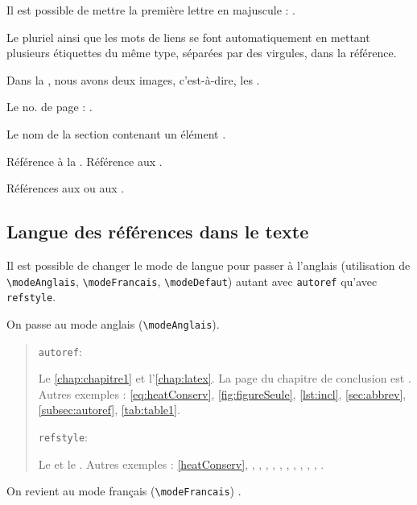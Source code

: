 Il est possible de mettre la première lettre en majuscule : .

Le pluriel ainsi que les mots de liens se font automatiquement en mettant plusieurs étiquettes du même type,  séparées par des virgules, dans la référence.

Dans la , nous avons deux images, c'est-à-dire, les .

Le no. de page : . 

Le nom de la section contenant un élément .

Référence à la . Référence aux .

Références aux  ou aux  .

\subsection{Langue des références dans le texte}
\label{subsec:three}

Il est possible de changer le mode de langue pour passer à l'anglais (utilisation de \verb|\modeAnglais|, \verb|\modeFrancais|, \verb|\modeDefaut|) autant avec \texttt{autoref} qu'avec \texttt{refstyle}.

On passe au mode anglais (\verb|\modeAnglais|).
\modeAnglais

\begin{quote}
	\texttt{autoref}:
	
	Le \autoref{chap:chapitre1} et l'\autoref{chap:latex}. La page du chapitre de conclusion est . Autres exemples : \autoref{eq:heatConserv}, \autoref{fig:figureSeule}, \autoref{lst:incl}, \autoref{sec:abbrev}, \autoref{subsec:autoref}, \autoref{tab:table1}.
	
	\texttt{refstyle}:
	
	Le  et le . Autres exemples : \eqref{heatConserv}, , , , , , , , , , , .
\end{quote}

On revient au mode français (\verb|\modeFrancais|) .
\modeFrancais

